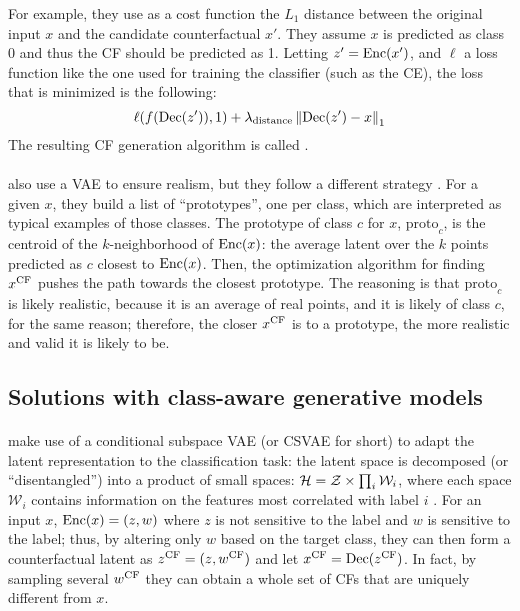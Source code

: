 \documentclass[../main.tex]{subfiles}
\begin{document}
For example, they use as a cost function the $L_1$ distance between the original input $x$ and the candidate counterfactual $x'$.
They assume $x$ is predicted as class 0 and thus the CF should be predicted as 1.
Letting $z'=\operatorname{Enc}(x')$, and $\ell$ a loss function like the one used for training the classifier (such as the CE), the loss that is minimized is the following:
\begin{equation}
	\ell(f(\operatorname{Dec}(z')), 1)
	+ \lambda_\text{distance} \left\lVert\operatorname{Dec}(z') - x\right\rVert_1
\end{equation}
The resulting CF generation algorithm is called \revise{} \cite{joshiRealistic2019}.

\paragraph{}

\citeauthor{vanlooverenInterpretable2021} also use a VAE to ensure realism, but they follow a different strategy \cite{vanlooverenInterpretable2021}.
For a given $x$, they build a list of ``prototypes'', one per class, which are interpreted as typical examples of those classes.
The prototype of class $c$ for $x$, $\text{proto}_c$, is the centroid of the $k$-neighborhood of $\operatorname{Enc}(x)$: the average latent over the $k$ points predicted as $c$ closest to $\operatorname{Enc}(x)$.
Then, the optimization algorithm for finding $x^\text{CF}$ pushes the path towards the closest prototype.
The reasoning is that $\text{proto}_c$ is likely realistic, because it is an average of real points, and it is likely of class $c$, for the same reason; therefore, the closer $x^\text{CF}$ is to a prototype, the more realistic and valid it is likely to be.

\subsection{Solutions with class-aware generative models}

\paragraph{}

\citeauthor{downsCRUDS2020} make use of a conditional subspace VAE (or CSVAE for short) to adapt the latent representation to the classification task:
the latent space is decomposed (or ``disentangled'') into a product of small spaces: $\mathcal{H} = \mathcal{Z} \times \prod_{i} \mathcal{W}_i$, where each space $\mathcal{W}_i$ contains information on the features most correlated with label $i$ \cite{klysLearning2018}.
For an input $x$, $\operatorname{Enc}(x) = (z, w)$ where $z$ is not sensitive to the label and $w$ is sensitive to the label; thus, by altering only $w$ based on the target class, they can then form a counterfactual latent as $z^\text{CF} = (z, w^\text{CF})$ and let $x^\text{CF} = \operatorname{Dec}(z^\text{CF})$.
In fact, by sampling several $w^\text{CF}$ they can obtain a whole set of CFs that are uniquely different from $x$.
\end{document}
